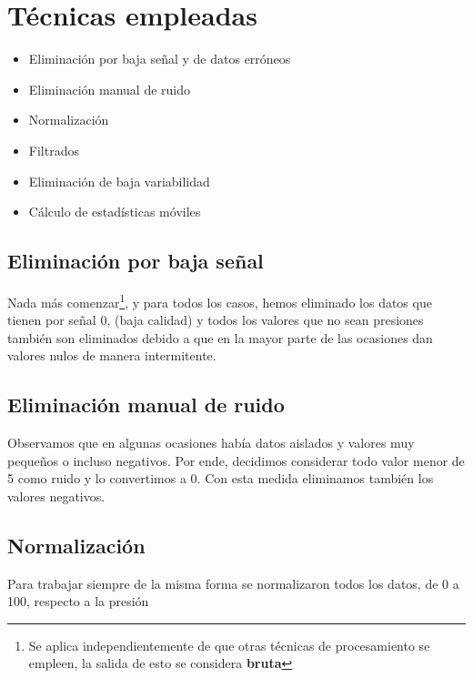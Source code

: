 \documentclass[a4paper,12pt,twoside,oldfontcommands]{memoir}
\begin{document}
\section{Técnicas empleadas}
\begin{itemize}
\item Eliminación por baja señal y de datos erróneos
\item Eliminación manual de ruido
\item Normalización
\item Filtrados
\item Eliminación de baja variabilidad
\item Cálculo de estadísticas móviles 
\end{itemize}
\subsection{Eliminación por baja señal}
Nada más comenzar\footnote{Se aplica independientemente de que otras técnicas de procesamiento se empleen, la salida de esto se considera \textbf{bruta}}, y para todos los casos, hemos eliminado los datos que tienen por señal 0, (baja calidad) y todos los valores que no sean presiones también son eliminados debido a que en la mayor parte de las ocasiones dan valores nulos de manera intermitente.

\subsection{Eliminación manual de ruido}
Observamos que en algunas ocasiones había datos aislados y valores muy pequeños o incluso negativos. Por ende, decidimos considerar todo valor menor de 5 como ruido y lo convertimos a 0. Con esta medida eliminamos también los valores negativos.
\subsection{Normalización}
Para trabajar siempre de la misma forma se normalizaron todos los datos, de 0 a 100, respecto a la presión
\end{document}

